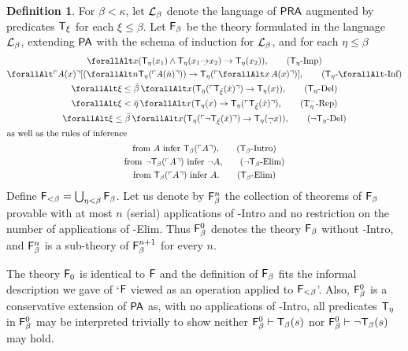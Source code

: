 \documentclass[UKenglish,cleveref,DIV=12]{scrartcl}
\let\forall\forallAlt
\theoremstyle{definition}
\newtheorem{definition}[lemma]{Definition}
\theoremstyle{definition}
\begin{document}
\begin{definition}%
For $\beta<\kappa$, let $\mathcal{L}_\beta$ denote the language of $\mathsf{PRA}$ augmented by
predicates  $\mathsf{T}_\xi$ for each $\xi\le\beta$. Let $\mathsf{F}_\beta$ be the theory
formulated in the language $\mathcal{L}_\beta$, extending $\mathsf{PA}$ with the schema of
induction for $\mathcal{L}_\beta$, and for each $\eta\le\beta$
\begin{gather}
  \forall x(\T_\eta(x_1)\land \T_\eta(x_1\dimplies x_2)\rightarrow \T_\eta(x_2)),
	  \tag{\textT\eta-Imp}\label{exteqn:T-Imp}\\
  \forall\gn {A(x)}[(\forall n \T_\eta(\gn{A(\dot n)}))\rightarrow
	\T_{\eta}(\gn{\forall x \,A(x)})],
	  \tag{\textT\eta-$\forall$-Inf}\label{exteqn:T-UInf}\\
  \forall \xi\le\bar\beta\,\forall x( \T_\eta(\gn{\T_{\dot{\xi}}(\dot
	x)})\rightarrow \T_\eta(x)),
	  \tag{\textT\eta-Del}\label{exteqn:T-dag1}\\
  \forall \xi<\bar\eta \,\forall x(\T_\eta(x)\rightarrow\T_\eta(\gn{
	  \T_{\dot{\xi}}(\dot x)}),
	  \tag{T$_\eta^-$-Rep}\label{exteqn:T-dag2}\\
  \forall \xi\le\bar\beta\,\forall x( \T_\eta(\gn{\lnot\T_{\dot{\xi}}(\dot x)})\rightarrow \T_\eta(\dlnot x)),
	  \tag{$\lnot$\textT\eta-Del}\label{exteqn:T-dag3}\\
\intertext{as well as the rules of inference}
  \text{from $A$ infer $\T_\beta(\gn A)$,}\tag{\textT\beta-Intro}
	  \label{exteqn:T-Intro}\\
  \text{from $\lnot \T_\beta(\gn A)$ infer $\lnot A$,}
	  \tag{$\lnot$\textT\beta-Elim}\label{exteqn:notT-Elim}\\
  \text{from $\T_\beta(\gn A)$ infer $A$.}\tag{\textT\beta-Elim}
	  \label{exteqn:T-Elim}
\end{gather}
Define $\mathsf{F}_{<\beta}=\bigcup_{\eta<\beta}\mathsf{F}_\beta$. Let us denote by $\mathsf{F}_\beta^n$
the collection of theorems of $\mathsf{F}_\beta$ provable with at most $n$ (serial) applications
of \textT\beta-Intro and no restriction on the number of applications of
\textT\beta-Elim. Thus $\mathsf{F}_\beta^0$ denotes the theory $\mathsf{F}_\beta$ without
\textT\beta-Intro, and
$\mathsf{F}_\beta^n$ is a sub-theory of $\mathsf{F}_\beta^{n+1}$ for every $n$.
\end{definition}
The theory $\mathsf{F}_0$ is identical to $\mathsf{F}$ and the definition of $\mathsf{F}_{\beta}$ fits
the informal description we gave of `$\mathsf{F}$ viewed as an operation applied to
$\mathsf{F}_{<\beta}$'. Also, $\mathsf{F}_\beta^0$ is a conservative extension of
$\mathsf{PA}$ as, with no applications of \textT\beta-Intro, all predicates $\mathsf{T}_\eta$ in
$\mathsf{F}_\beta^0$ may be interpreted trivially to show neither $\mathsf{F}_\beta^0\vdash
\mathsf{T}_\beta(s)$ nor $\mathsf{F}_\beta^0\vdash \lnot \mathsf{T}_\beta(s)$ may hold.
\end{document}
